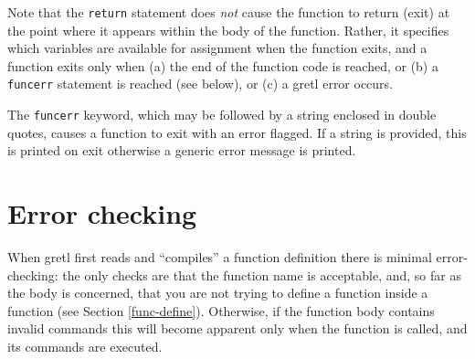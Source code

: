 Note that the \verb+return+ statement does \emph{not} cause the
function to return (exit) at the point where it appears within the
body of the function. Rather, it specifies which variables are
available for assignment when the function exits, and a function exits
only when (a) the end of the function code is reached, or (b) a
\verb+funcerr+ statement is reached (see below), or (c) a gretl error
occurs.
    
The \verb+funcerr+ keyword, which may be followed by a string enclosed
in double quotes, causes a function to exit with an error flagged.  If
a string is provided, this is printed on exit otherwise a generic
error message is printed.
    

\section{Error checking}
\label{func-errors}

When gretl first reads and ``compiles'' a function definition there is
minimal error-checking: the only checks are that the function name is
acceptable, and, so far as the body is concerned, that you are not
trying to define a function inside a function (see Section
\ref{func-define}). Otherwise, if the function body contains invalid
commands this will become apparent only when the function is called,
and its commands are executed.
    

